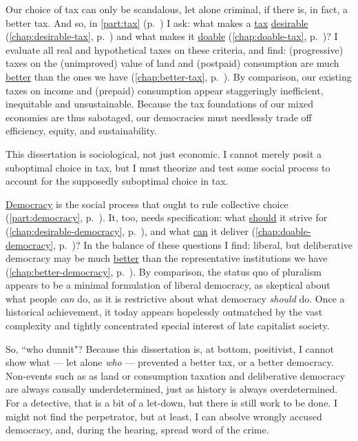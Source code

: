 Our choice of tax can only be scandalous, let alone criminal, if there is, in fact, a better tax.
And so, in \autoref{part:tax} (p.~\pageref{part:tax}) I ask:
what makes a \hyperref[part:tax]{tax} \hyperref[chap:desirable-tax]{desirable} (\autoref{chap:desirable-tax}, p.~\pageref{chap:desirable-tax}) and what makes it \hyperref[chap:doable-tax]{doable} (\autoref{chap:doable-tax}, p.~\pageref{chap:doable-tax})?
I evaluate all real and hypothetical taxes on these criteria, and find:
(progressive) taxes on the (unimproved) value of land and (postpaid) consumption are much \hyperref[chap:better-tax]{better} than the ones we have (\autoref{chap:better-tax}, p.~\pageref{chap:better-tax}).
By comparison, our existing taxes on income and (prepaid) consumption appear staggeringly inefficient, inequitable and unsustainable.
Because the tax foundations of our mixed economies are thus sabotaged, our democracies must needlessly trade off efficiency, equity, and sustainability.

This dissertation is sociological, not just economic.
I cannot merely posit a suboptimal choice in tax, but I must theorize and test some social process to account for the supposedly suboptimal choice in tax.

\hyperref[part:democracy]{Democracy} is the social process that ought to rule collective choice (\autoref{part:democracy}, p.~\pageref{part:democracy}).
It, too, needs specification:
what \hyperref[chap:desirable-democracy]{should} it strive for (\autoref{chap:desirable-democracy}, p.~\pageref{chap:desirable-democracy}), and what \hyperref[chap:doable-democracy]{can} it deliver (\autoref{chap:doable-democracy}, p.~\pageref{chap:doable-democracy})?
In the balance of these questions I find:
liberal, but deliberative democracy may be much \hyperref[chap:better-democracy]{better} than the representative institutions we have (\autoref{chap:better-democracy}, p.~\pageref{chap:better-democracy}).
By comparison, the status quo of pluralism appears to be a minimal formulation of liberal democracy, as skeptical about what people \emph{can} do, as it is restrictive about what democracy \emph{should} do.
Once a historical achievement, it today appears hopelessly outmatched by the vast complexity and tightly concentrated special interest of late capitalist society.

So, ``who dunnit"?
Because this dissertation is, at bottom, positivist, I cannot show what --- let alone \emph{who} --- prevented a better tax, or a better democracy.
Non-events such as as land or consumption taxation and deliberative democracy are always causally underdetermined, just as history is always overdetermined.
For a detective, that is a bit of a let-down, but there is still work to be done.
I might not find the perpetrator, but at least, I can absolve wrongly accused democracy, and, during the hearing, spread word of  the crime.

